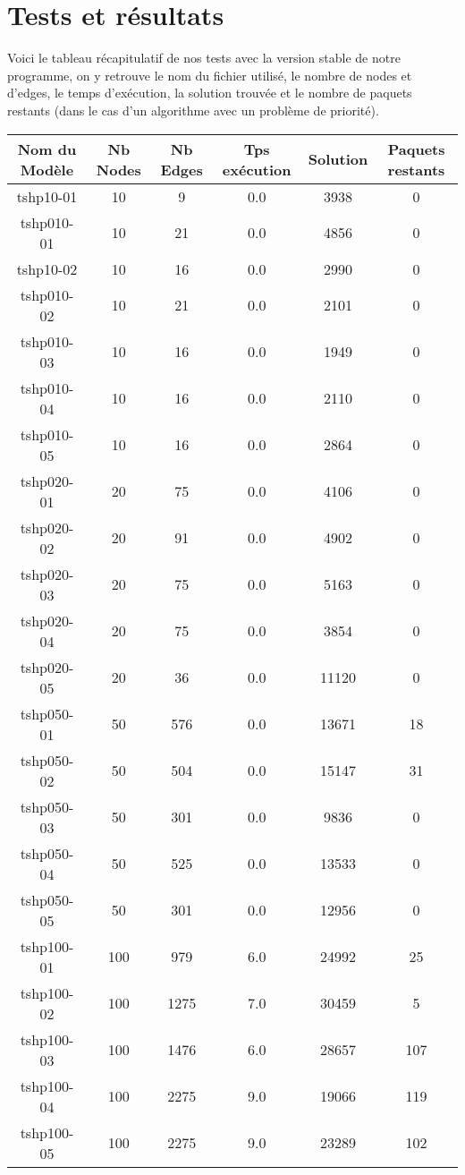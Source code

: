 \documentclass[a4paper,10pt]{article}
\begin{document}
\section{Tests et résultats}

Voici le tableau récapitulatif de nos tests avec la version stable de notre programme, on y 
retrouve le nom du fichier utilisé, le nombre de nodes et d'edges, le temps d'exécution, la 
solution trouvée et le nombre de paquets restants (dans le cas d'un algorithme avec un problème de
priorité).\newline

\begin{tabular}{|c|c|c|c|c|c|}
  \hline
  Nom du Modèle & Nb Nodes & Nb Edges & Tps exécution & Solution & Paquets restants\\
  \hline
  tshp10-01 & 10 & 9 & 0.0 & 3938 & 0\\
  tshp010-01 & 10 & 21 & 0.0 & 4856 & 0\\
  tshp10-02 & 10 & 16 & 0.0 & 2990 & 0\\
  tshp010-02 & 10 & 21 & 0.0 & 2101 & 0\\
  tshp010-03 & 10 & 16 & 0.0 & 1949 & 0\\
  tshp010-04 & 10 & 16 & 0.0 & 2110 & 0\\
  tshp010-05 & 10 & 16 & 0.0 & 2864 & 0\\
  tshp020-01 & 20 & 75 & 0.0 & 4106 & 0\\
  tshp020-02 & 20 & 91 & 0.0 & 4902 & 0\\
  tshp020-03 & 20 & 75 & 0.0 & 5163 & 0\\
  tshp020-04 & 20 & 75 & 0.0 & 3854 & 0\\
  tshp020-05 & 20 & 36 & 0.0 & 11120 & 0\\
  tshp050-01 & 50 & 576 & 0.0 & 13671 & 18\\
  tshp050-02 & 50 & 504 & 0.0 & 15147 & 31\\
  tshp050-03 & 50 & 301 & 0.0 & 9836 & 0\\
  tshp050-04 & 50 & 525 & 0.0 & 13533 & 0\\
  tshp050-05 & 50 & 301 & 0.0 & 12956 & 0\\
  tshp100-01 & 100 & 979 & 6.0 & 24992 & 25\\
  tshp100-02 & 100 & 1275 & 7.0 & 30459 & 5\\
  tshp100-03 & 100 & 1476 & 6.0 & 28657 & 107\\
  tshp100-04 & 100 & 2275 & 9.0 & 19066 & 119\\
  tshp100-05 & 100 & 2275 & 9.0 & 23289 & 102\\
  \hline
\end{tabular}
\end{document}

